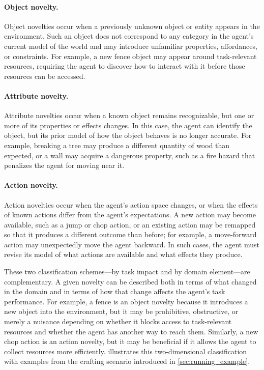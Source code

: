 \paragraph{Object novelty.} Object novelties occur when a previously unknown object or entity appears in the environment. Such an object does not correspond to any category in the agent's current model of the world and may introduce unfamiliar properties, affordances, or constraints. For example, a new fence object may appear around task-relevant resources, requiring the agent to discover how to interact with it before those resources can be accessed.

\paragraph{Attribute novelty.} Attribute novelties occur when a known object remains recognizable, but one or more of its properties or effects changes. In this case, the agent can identify the object, but its prior model of how the object behaves is no longer accurate. For example, breaking a tree may produce a different quantity of wood than expected, or a wall may acquire a dangerous property, such as a fire hazard that penalizes the agent for moving near it.

\paragraph{Action novelty.} Action novelties occur when the agent's action space changes, or when the effects of known actions differ from the agent's expectations. A new action may become available, such as a jump or chop action, or an existing action may be remapped so that it produces a different outcome than before; for example, a move-forward action may unexpectedly move the agent backward. In such cases, the agent must revise its model of what actions are available and what effects they produce.

These two classification schemes---by task impact and by domain element---are complementary. A given novelty can be described both in terms of what changed in the domain and in terms of how that change affects the agent's task performance. For example, a fence is an object novelty because it introduces a new object into the environment, but it may be prohibitive, obstructive, or merely a nuisance depending on whether it blocks access to task-relevant resources and whether the agent has another way to reach them. Similarly, a new chop action is an action novelty, but it may be beneficial if it allows the agent to collect resources more efficiently.  illustrates this two-dimensional classification with examples from the crafting scenario introduced in \cref{sec:running_example}.

